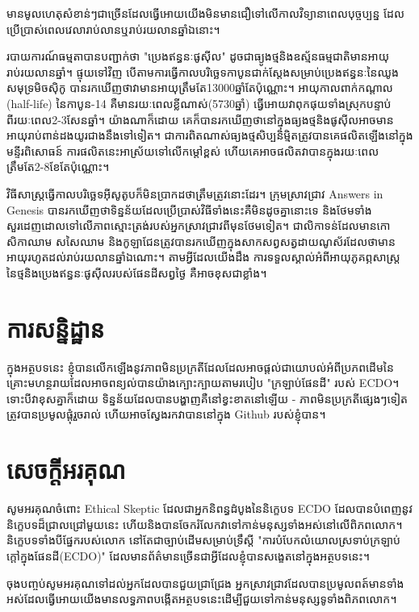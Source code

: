 \documentclass[10pt,twocolumn,letterpaper]{article}
\begin{document}
មានមូលហេតុសំខាន់ៗជាច្រើនដែលធ្វើអោយយើងមិនមានជឿទៅលើកាលវិទ្យានាពេលបុច្ចប្បន្ន ដែលប្រើប្រាស់ពេលវេលារាប់លានឬរាប់រយលានឆ្នាំឯនោះ។

របាយការណ៍ធម្មតាបានបញ្ជាក់ថា "ប្រេងឥន្ធនៈផូសុីល" ដូចជាធ្យូងថ្មនិងឧស្ម័នធម្មជាតិមានអាយុរាប់រយលានឆ្នាំ\cite{104}។ ផ្ទុយទៅវិញ បើតាមការធ្វើកាលបរិច្ឆេទកាបូនជាក់ស្តែងសម្រាប់ប្រេងឥន្ធនៈនៃឈូងសមុទ្រមិចស៊ិកូ បានរកឃើញថាវាមានអាយុត្រឹមតែ13000ឆ្នាំតែប៉ុណ្ណោះ\cite{105}។ អាយុកាលពាក់កណ្តាល (half-life) នៃកាបូន-14 គឺមានរយៈពេលខ្លីណាស់(5730ឆ្នាំ) ធ្វើអោយវាពុកផុយទាំងស្រុកបន្ទាប់ពីរយៈពេល2-3សែនឆ្នាំ។ យ៉ាងណាក៏ដោយ គេក៏បានរកឃើញថានៅក្នុងធ្យងថ្មនិងផូសុីលអាចមានអាយុរាប់ពាន់ដងយូរជាងនឹងទៅទៀត\cite{106}។ ជាការពិតណាស់ធ្យងថ្មសិប្បនិម្មិតត្រូវបានគេផលិតឡើងនៅក្នុងមន្ទីរពិសោធន៍ ការផលិតនេះអាស្រ័យទៅលើកម្តៅខ្ពស់ ហើយគេអាចផលិតវាបានក្នុងរយៈពេលត្រឹមតែ2-8ខែតែប៉ុណ្ណោះ\cite{107}។

វិធីសាស្ត្រធ្វើកាលបរិច្ឆេទអុីសូតូបក៏មិនប្រាកដថាត្រឹមត្រូវនោះដែរ។ ក្រុមស្រាវជ្រាវ Answers in Genesis បានរកឃើញថាទិន្នន័យដែលប្រើប្រាស់វិធីទាំងនេះគឺមិនដូចគ្នានោះទេ និងថែមទាំងសួរដេញដោលទៅលើភាពស្មោះត្រង់របស់អ្នកស្រាវជ្រាវពីមុនថែមទៀត\cite{108}។ ជាលិកាទន់ដែលមានកោសិកាឈាម សសៃឈាម និងកូឡាជែនត្រូវបានរកឃើញក្នុងសាកសព្វសត្វដាយណូស័រដែលថាមានអាយុរហូតដល់រាប់រយលានឆ្នាំឯណោះ\cite{109,110}។ តាមអ្វីដែលយើងដឹង ការទទួលស្គាល់អំពីអាយុភូគព្ភសាស្ត្រនៃថ្មនិងប្រេងឥន្ធនៈផូសុីលរបស់ផែនដីសព្វថ្ងៃ គឺអាចខុសជាខ្លាំង។ 

\section{ការសន្និដ្ឋាន}

ក្នុងអត្ថបទនេះ ខ្ញុំបានលើកឡើងនូវភាពមិនប្រក្រតីដែលដែលអាចផ្តល់ជាយោបល់អំពីប្រភពដើមនៃគ្រោះមហន្ថរាយដែលអាចពន្យល់បានយ៉ាងក្បោះក្បាយតាមរបៀប "ក្រឡាប់ផែនដី" របស់ ECDO។ ទោះបីវាខុសគ្នាក៏ដោយ ទិន្នន័យដែលបានបង្ហាញគឺនៅខ្វះខាតនៅឡើយ - ភាពមិនប្រក្រតីផ្សេងៗទៀតត្រូវបានប្រមូលផ្តុំរួចរាល់ ហើយអាចស្វែងរកវាបាននៅក្នុង Github របស់ខ្ញុំបាន\cite{2}។
\section{សេចក្ដីអរគុណ}

សូមអរគុណចំពោះ Ethical Skeptic ដែលជាអ្នកនិពន្ធដំបូងនៃនិក្ខេបទ ECDO ដែលបានបំពេញនូវនិក្ខេបទដ៏ជ្រាលជ្រៅមួយនេះ ហើយនិងបានចែករំលែកវាទៅកាន់មនុស្សទាំងអស់នៅលើពិភពលោក។ និក្ខេបទទាំងបីផ្នែករបស់លោក\cite{1} នៅតែជាច្បាប់ដើមសម្រាប់ទ្រឹស្តី "ការបំបែកលំយោលស្រទាប់ក្រឡាប់ក្តៅក្នុងផែនដី(ECDO)" ដែលមានព័ត៌មានច្រើនជាអ្វីដែលខ្ញុំបានសង្ខេតនៅក្នុងអត្ថបទនេះ។

ចុងបញ្ចប់សូមអរគុណទៅដល់អ្នកដែលបានជួយជ្រាជ្រែង អ្នកស្រាវជ្រាវដែលបានប្រមូលពត៍មានទាំងអស់ដែលធ្វើអោយយើងមានលទ្ធភាពបង្កើតអត្ថបទនេះដើម្បីជួយទៅកាន់មនុស្សទូទាំងពិភពលោក។

\clearpage
\twocolumn

{\small


}
\end{document}
